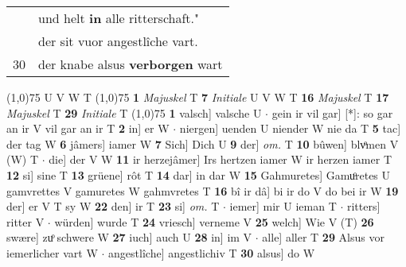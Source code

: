 \documentclass[8pt,a4paper,notitlepage]{article}
\begin{document}
\begin{table}[ht]
\begin{minipage}[t]{0.5\linewidth}
\begin{tabular}{rl}
 & und helt \textbf{in} alle ritterschaft."\\ 
 & der sit vuor angestlîche vart.\\ 
30 & der knabe alsus \textbf{verborgen} wart\\ 
\end{tabular}
\scriptsize
\line(1,0){75} \newline
U V W T \newline
\line(1,0){75} \newline
\textbf{1} \textit{Majuskel} T  \textbf{7} \textit{Initiale} U V W T  \textbf{16} \textit{Majuskel} T  \textbf{17} \textit{Majuskel} T  \textbf{29} \textit{Initiale} T  \newline
\line(1,0){75} \newline
\textbf{1} valsch] valsche U  $\cdot$ gein ir vil gar] [*]: so gar an ir V vil gar an ir T \textbf{2} in] er W  $\cdot$ niergen] uenden U niender W nie da T \textbf{5} tac] der tag W \textbf{6} jâmers] iamer W \textbf{7} Sich] Dich U \textbf{9} der] \textit{om.} T \textbf{10} bûwen] blvͦmen V (W) T  $\cdot$ die] der V W \textbf{11} ir herzejâmer] Irs hertzen iamer W ir herzen iamer T \textbf{12} si] sine T \textbf{13} grüene] rôt T \textbf{14} dar] in dar W \textbf{15} Gahmuretes] Gamuͦretes U gamvrettes V gamuretes W gahmvretes T \textbf{16} bî ir dâ] bi ir do V do bei ir W \textbf{19} der] er V T sy W \textbf{22} den] ir T \textbf{23} si] \textit{om.} T  $\cdot$ iemer] mir U ieman T  $\cdot$ ritters] ritter V  $\cdot$ würden] wurde T \textbf{24} vriesch] verneme V \textbf{25} welch] Wie V (T) \textbf{26} swære] zuͦ schwere W \textbf{27} iuch] auch U \textbf{28} in] im V  $\cdot$ alle] aller T \textbf{29} Alsus vor iemerlicher vart W  $\cdot$ angestlîche] angestlichiv T \textbf{30} alsus] do W \newline
\end{minipage}
\end{table}
\end{document}

